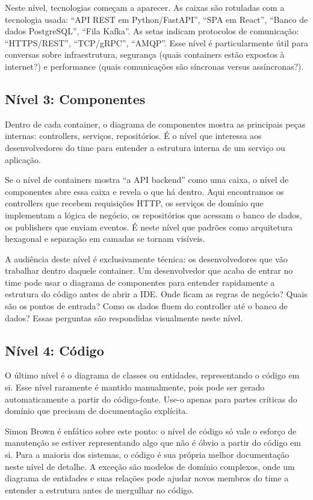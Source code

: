 Neste nível, tecnologias começam a aparecer. As caixas são rotuladas com a
tecnologia usada: ``API REST em Python/FastAPI'', ``SPA em React'', ``Banco
de dados PostgreSQL'', ``Fila Kafka''. As setas indicam protocolos de
comunicação: ``HTTPS/REST'', ``TCP/gRPC'', ``AMQP''. Esse nível é
particularmente útil para conversas sobre infraestrutura, segurança (quais
containers estão expostos à internet?) e performance (quais comunicações
são síncronas versus assíncronas?).

\subsection{Nível 3: Componentes}

Dentro de cada container, o diagrama de componentes mostra as principais peças
internas: controllers, serviços, repositórios. É o nível que interessa aos
desenvolvedores do time para entender a estrutura interna de um serviço ou
aplicação.

Se o nível de containers mostra ``a API backend'' como uma caixa, o nível de
componentes abre essa caixa e revela o que há dentro. Aqui encontramos os
controllers que recebem requisições HTTP, os serviços de domínio que
implementam a lógica de negócio, os repositórios que acessam o banco de
dados, os publishers que enviam eventos. É neste nível que padrões como
arquitetura hexagonal e separação em camadas se tornam visíveis.

A audiência deste nível é exclusivamente técnica: os desenvolvedores que
vão trabalhar dentro daquele container. Um desenvolvedor que acaba de
entrar no time pode usar o diagrama de componentes para entender rapidamente
a estrutura do código antes de abrir a IDE. Onde ficam as regras de negócio?
Quais são os pontos de entrada? Como os dados fluem do controller até o
banco de dados? Essas perguntas são respondidas visualmente neste nível.

\subsection{Nível 4: Código}

O último nível é o diagrama de classes ou entidades, representando o código em
si. Esse nível raramente é mantido manualmente, pois pode ser
gerado automaticamente a partir do código-fonte. Use-o apenas para partes
críticas do domínio que precisam de documentação explícita.

Simon Brown é enfático sobre este ponto: o nível de código só vale o esforço
de manutenção se estiver representando algo que não é óbvio a partir do
código em si. Para a maioria dos sistemas, o código é sua própria melhor
documentação neste nível de detalhe. A exceção são modelos de domínio
complexos, onde um diagrama de entidades e suas relações pode ajudar
novos membros do time a entender a estrutura antes de mergulhar no código.

